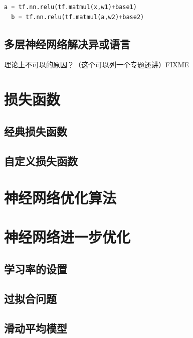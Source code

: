 \documentclass{article}\usepackage{listings} \usepackage{braket} \usepackage{amsmath,amssymb} \usepackage{geometry} \usepackage{graphicx} \usepackage{fancyvrb}\usepackage{braket} \usepackage{bm}\usepackage{hyperref} \usepackage{CJKutf8} \geometry{left=0.2cm,right=0.2cm,top=0.2cm,bottom=0.2cm} \renewcommand{\theequation}{\arabic{section}.\arabic{equation}} \renewcommand{\baselinestretch}{1.5}
\begin{document}
\begin{CJK}{UTF8}{gbsn}
\begin{lstlisting}[language=python]
  a = tf.nn.relu(tf.matmul(x,w1)+base1)
  b = tf.nn.relu(tf.matmul(a,w2)+base2)
\end{lstlisting}

\subsection{多层神经网络解决异或语言}
\label{sec:org32c6c09}

理论上不可以的原因？（这个可以列一个专题还讲）FIXME

\section{损失函数}
\label{sec:org8d79a79}

\subsection{经典损失函数}
\label{sec:org5239194}
\subsection{自定义损失函数}
\label{sec:org2b3e954}

\section{神经网络优化算法}
\label{sec:org90a2418}
\section{神经网络进一步优化}
\label{sec:org5f20e0b}

\subsection{学习率的设置}
\label{sec:org11bb285}

\subsection{过拟合问题}
\label{sec:org9516d59}

\subsection{滑动平均模型}
\label{sec:org8864399}
  
  
\end{CJK}
\end{document}
